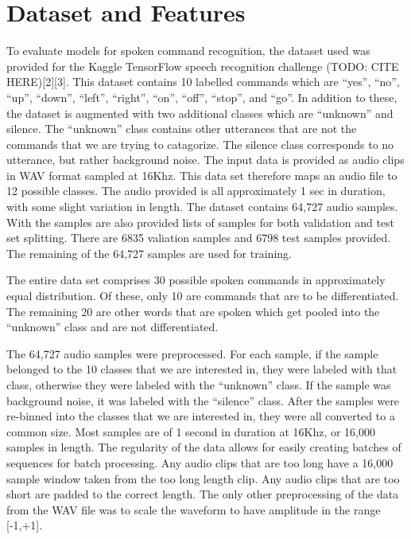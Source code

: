 \documentclass{article}
\begin{document}
\section{Dataset and Features}
To evaluate models for spoken command recognition, the dataset used
was provided for the Kaggle TensorFlow speech recognition
challenge (TODO: CITE HERE)[2][3]. This dataset contains 10 labelled commands
which are ``yes'', ``no'', ``up'', ``down'', ``left'', ``right'', ``on'', ``off'',
``stop'', and ``go''. In addition to these, the dataset is augmented with
two additional classes which are “unknown” and silence. The “unknown”
class contains other utterances that are not the commands that we are
trying to catagorize. The silence class corresponds to no
utterance, but rather background noise. The input data is provided as
audio clips in WAV format sampled at 16Khz. This data set therefore
maps an audio file to 12 possible classes. The audio provided is all
approximately 1 sec in duration, with some slight variation in
length. The dataset contains 64,727 audio samples. With the samples
are also provided lists of samples for both validation and test set
splitting. There are 6835 valiation samples and 6798 test samples
provided. The remaining of the 64,727 samples are used for training.

The entire data set comprises 30 possible spoken commands in
approximately equal distribution. Of these, only 10 are commands that
are to be differentiated. The remaining 20 are other words that are
spoken which get pooled into the ``unknown'' class and are not
differentiated.

The 64,727 audio samples were preprocessed. For each sample, if the
sample belonged to the 10 classes that we are interested in, they were
labeled with that class, otherwise they were labeled with the
``unknown'' class. If the sample was background noise, it was labeled
with the ``silence'' class. After the samples were re-binned into the
classes that we are interested in, they were all converted to a common
size. Most samples are of 1 second in duration at 16Khz, or 16,000
samples in length. The regularity of the data allows for easily
creating batches of sequences for batch processing. Any audio clips
that are too long have a 16,000 sample window taken from the too long
length clip. Any audio clips that are too short are padded to the correct
length. The only other preprocessing of the data from the WAV file was
to scale the waveform to have amplitude in the range [-1,+1].
\end{document}
